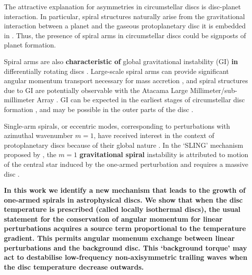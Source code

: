\documentclass[useAMS,usenatbib]{mn2e}
\begin{document}
The attractive explanation for asymmetries in circumstellar discs is
disc-planet interaction. In particular, spiral structures  
naturally arise from the gravitational interaction between a
planet and the gaseous protoplanetary disc it is embedded in
\citep[see, e.g.][for a recent review]{baruteau13b}. Thus, the
presence of spiral arms in circumstellar discs could be signposts of 
planet formation.  

Spiral arms are also {\bf characteristic of} global gravitational 
instability (GI) {\bf in} differentially rotating discs
\citep{goldreich65,laughlin96b,laughlin98,nelson98,lodato05,forgan11}. Large-scale 
spiral arms can provide significant angular momentum transport
necessary for mass accretion \citep{lynden-bell72,
  papaloizou91,balbus99,lodato04}, and spiral structures due to GI are
potentially observable with the Atacama Large
Millimeter/sub-millimeter Array \citep{cossins10,dipierror14}. GI can
be expected in the earliest stages of circumstellar disc formation 
\citep{kratter10b,inutsuka10,tsukamoto13}, and may be possible in the
outer parts of the disc \citep{rafikov05,matzner05,kimura12}.  

Single-arm spirals, or eccentric modes, corresponding to perturbations 
with azimuthal wavenumber $m=1$, have received interest in
the context of protoplanetary discs because of their global nature
\citep{adams89,heemskerk92,laughlin96,tremaine01,papaloizou02,hopkins10}. 
In the `SLING' mechanism proposed by \cite{shu90}, the $m=1$ {\bf
  gravitational spiral} instability is attributed to motion of the
central star induced by the one-armed perturbation and requires a
massive disc \citep[the former may have observable consequences,
][]{michael10}.    



{\bf
  In this work we identify a new mechanism that leads to the growth of
  one-armed spirals in astrophysical discs. We show
  that when the disc temperature is prescribed (called locally isothermal
  discs), the usual statement for the conservation of angular momentum
  for linear perturbations acquires a source term proportional to the
  temperature gradient. This permits angular momenum exchange between
  linear perturbations and the background disc. This `background
  torque' may act to destabilise low-frequency non-axisymmetric
  trailing waves when the disc temperature decrease outwards.       
}  
\end{document}
